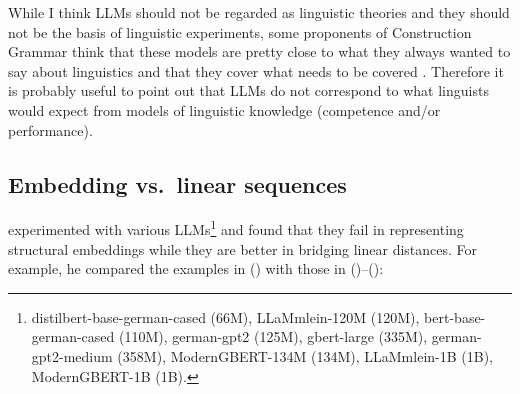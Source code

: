 While I think LLMs should not be regarded as linguistic theories and they should not be the basis of
linguistic experiments, some proponents of Construction Grammar think that these models are pretty
close to what they always wanted to say about linguistics and that they cover what needs to be
covered \citep{AmbridgeBlything2024a,Goldberg2024a}. Therefore it is probably useful to point out
that LLMs do not correspond to what linguists would expect from models of linguistic knowledge
(competence and/or performance).

\subsection{Embedding vs.\ linear sequences}

\citet{Webelhuth2026a} experimented with various LLMs\footnote{
distilbert-base-german-cased (66M), LLaMmlein-120M (120M), bert-base-german-cased (110M), german-gpt2 (125M), gbert-large (335M), german-gpt2-medium (358M), ModernGBERT-134M (134M), LLaMmlein-1B (1B), ModernGBERT-1B (1B).
} and found that they fail in
representing structural embeddings while they are better in bridging linear distances.
For example, he compared the examples in () with those in
()--():
\eal
{}
\zl
\eal
\label{ex-Den-dem Bericht hatten diese Schauspielerinnen versucht, zu unterschlagen}
\zl
\eal
\label{ex-embedding-4}
